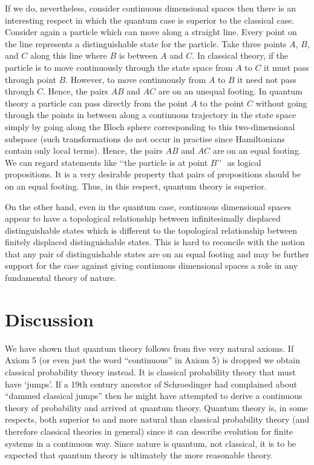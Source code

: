 \documentclass[10pt,twocolumn]{article}
\begin{document}
If we do, nevertheless, consider continuous dimensional spaces then there
is an interesting respect in which the quantum case is superior to the
classical case.  Consider again a particle which can move along a
straight line. Every point on the line represents a distinguishable
state for the particle.  Take three points $A$, $B$, and $C$ along this
line where $B$ is between $A$ and $C$.  In classical theory, if the
particle is to move continuously through the state space from $A$ to $C$
it must pass through point $B$.  However, to move continuously from $A$
to $B$ it need not pass through $C$.  Hence, the pairs $AB$ and $AC$ are
on an unequal footing.  In quantum theory a particle can pass directly
from the point $A$ to the point $C$ without going through the points in
between along a continuous trajectory in the state space simply by
going along the Bloch sphere corresponding to this two-dimensional
subspace (such transformations do not occur in practise since
Hamiltonians contain only local terms).  Hence, the pairs $AB$ and $AC$
are on an equal footing. We can regard statements like \lq\lq the
particle is at point $B$\rq\rq\,\,  as logical propositions. It is
a very desirable property that pairs of propositions should be on an
equal footing.  Thus, in this respect, quantum theory is superior.

On the other hand, even in the quantum case,
continuous dimensional spaces appear to have a topological relationship
between infinitesimally displaced distinguishable states which is
different to the topological relationship between finitely displaced
distinguishable states. This is hard to reconcile with the notion that
any pair of distinguishable states are on an equal footing and may be
further support for the case against giving continuous dimensional
spaces a role in any fundamental theory of nature.




\section{Discussion}

We have shown that quantum theory follows from five very natural axioms.
If Axiom 5 (or even just the word ``continuous'' in Axiom 5)
is dropped we obtain classical probability theory instead.  It is classical
probability theory that must have \lq jumps\rq.  If a 19th century ancestor
of Schroedinger had complained about ``dammed classical jumps''
then he might have attempted to derive a continuous theory of
probability and arrived at quantum theory.  Quantum theory is, in some
respects, both superior to and more natural than classical probability
theory (and
therefore classical theories in general) since it can describe evolution for
finite systems in a continuous way.  Since nature is quantum,
not classical, it is to be expected that quantum theory
is ultimately the more reasonable theory.
\end{document}
